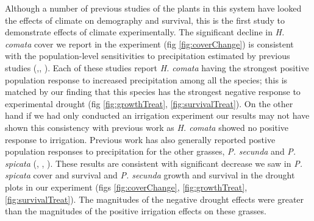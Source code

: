 \documentclass[11pt]{article}
\begin{document}
\begin{doublespacing}
Although a number of previous studies of the plants in this system have looked the effects of climate on demography and survival, this is the first study to demonstrate effects of climate experimentally. The significant decline in \textit{H. comata} cover we report in the experiment (fig \ref{fig:coverChange}) is consistent with the population-level sensitivities to precipitation estimated by previous studies (\citep{chu_direct_2016},\citep{dalgleish_climate_2010}, \citep{adler_forecasting_2012}). Each of these studies report \textit{H. comata} having the strongest positive population response to increased precipitation among all the species; this is matched by our finding that this species has the strongest negative response to experimental drought (fig \ref{fig:growthTreat}, \ref{fig:survivalTreat}). On the other hand if we had only conducted an irrigation experiment our results may not have shown this consistency with previous work as \textit{H. comata} showed no positive response to irrigation. Previous work has also generally reported postive population responses to precipitation for the other grasses, \textit{P. secunda} and \textit{P. spicata} (\citep{adler_forecasting_2012}, \citep{chu_direct_2016}, \citep{dalgleish_climate_2010}). These results are consistent with significant decrease we saw in \textit{P. spicata} cover and survival and \textit{P. secunda} growth and survival in the drought plots in our experiment (figs \ref{fig:coverChange}, \ref{fig:growthTreat}, \ref{fig:survivalTreat}). The magnitudes of the negative drought effects were greater than the magnitudes of the positive irrigation effects on these grasses. 


\end{doublespacing}
\end{document}
